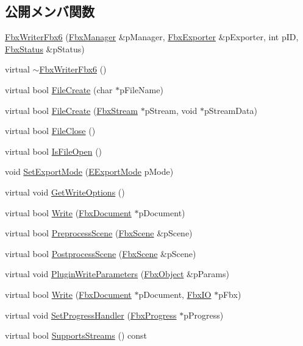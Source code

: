 \subsection*{公開メンバ関数}
\begin{DoxyCompactItemize}
\item 
\hyperlink{class_fbx_writer_fbx6_a5e769fdd71d624e99ccbfea3bbba56e3}{Fbx\+Writer\+Fbx6} (\hyperlink{class_fbx_manager}{Fbx\+Manager} \&p\+Manager, \hyperlink{class_fbx_exporter}{Fbx\+Exporter} \&p\+Exporter, int p\+ID, \hyperlink{class_fbx_status}{Fbx\+Status} \&p\+Status)
\item 
virtual \hyperlink{class_fbx_writer_fbx6_a28014ee73344e01d4bb12d3b39ec7c94}{$\sim$\+Fbx\+Writer\+Fbx6} ()
\item 
virtual bool \hyperlink{class_fbx_writer_fbx6_ae7ad665b515f5896f2263cce0e5f38fc}{File\+Create} (char $\ast$p\+File\+Name)
\item 
virtual bool \hyperlink{class_fbx_writer_fbx6_a57ad09a9ed4651fee6979cf95c7d4f62}{File\+Create} (\hyperlink{class_fbx_stream}{Fbx\+Stream} $\ast$p\+Stream, void $\ast$p\+Stream\+Data)
\item 
virtual bool \hyperlink{class_fbx_writer_fbx6_a936f95dcb66f93ebd4ae2e8d8a0339b6}{File\+Close} ()
\item 
virtual bool \hyperlink{class_fbx_writer_fbx6_ada26031c01e10e3f54431739e9286d64}{Is\+File\+Open} ()
\item 
void \hyperlink{class_fbx_writer_fbx6_a34aaf430c9225fbfcab85168a9dd47c6}{Set\+Export\+Mode} (\hyperlink{class_fbx_writer_fbx6_a8fd1f1f068e0ba64fe7694877bf15f21}{E\+Export\+Mode} p\+Mode)
\item 
virtual void \hyperlink{class_fbx_writer_fbx6_a62f398d8ed2746ea076481d920f481e4}{Get\+Write\+Options} ()
\item 
virtual bool \hyperlink{class_fbx_writer_fbx6_a27073868a5a3c4b315e443032916d7d7}{Write} (\hyperlink{class_fbx_document}{Fbx\+Document} $\ast$p\+Document)
\item 
virtual bool \hyperlink{class_fbx_writer_fbx6_a5109088d4869c129427058045efb8808}{Preprocess\+Scene} (\hyperlink{class_fbx_scene}{Fbx\+Scene} \&p\+Scene)
\item 
virtual bool \hyperlink{class_fbx_writer_fbx6_a9a595d04ed83c441705a4be5720e97dc}{Postprocess\+Scene} (\hyperlink{class_fbx_scene}{Fbx\+Scene} \&p\+Scene)
\item 
virtual void \hyperlink{class_fbx_writer_fbx6_a2dd451ffa9e15aca1f5130c7334163a4}{Plugin\+Write\+Parameters} (\hyperlink{class_fbx_object}{Fbx\+Object} \&p\+Params)
\item 
virtual bool \hyperlink{class_fbx_writer_fbx6_ac5b13eab3a34a36ad1fc63bde58e75bc}{Write} (\hyperlink{class_fbx_document}{Fbx\+Document} $\ast$p\+Document, \hyperlink{class_fbx_i_o}{Fbx\+IO} $\ast$p\+Fbx)
\item 
virtual void \hyperlink{class_fbx_writer_fbx6_a3877fb079da98f7883ec977a5fe206f1}{Set\+Progress\+Handler} (\hyperlink{class_fbx_progress}{Fbx\+Progress} $\ast$p\+Progress)
\item 
virtual bool \hyperlink{class_fbx_writer_fbx6_a74bc2a2a859a59118567ac2d0a471ef7}{Supports\+Streams} () const
\end{DoxyCompactItemize}
